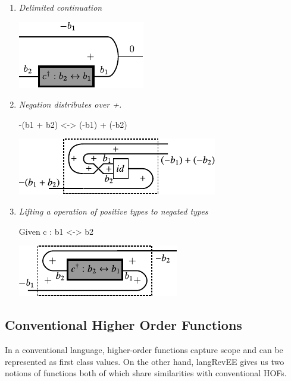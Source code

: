 \documentclass[preprint]{sigplanconf}
\begin{document}
\begin{enumerate}
\item
\emph{Delimited continuation}

\begin{center}
  \includegraphics{diagrams/delimc.pdf}
\end{center}

\item
\emph{Negation distributes over {{+}}. }

{{-(b1 + b2) <-> (-b1) + (-b2)}}

\begin{center}
  \includegraphics{diagrams/dist_neg_plus.pdf}
\end{center}

\item
\emph{Lifting a operation of positive types to negated types}

Given {{c : b1 <-> b2}}

\begin{center}
  \includegraphics{diagrams/neg_lift.pdf}
\end{center}

\end{enumerate}


\subsection{Conventional Higher Order Functions}
\label{sec:hof}

In a conventional language, higher-order functions capture scope and
can be represented as first class values. On the other hand,
{{langRevEE}} gives us two notions of functions both of which share
similarities with conventional HOFs. 
\end{document}
